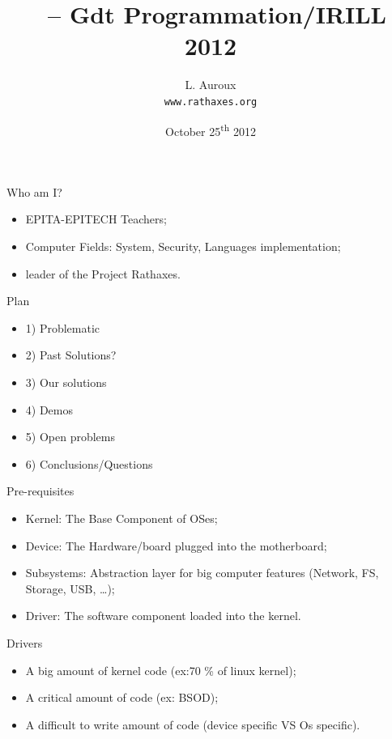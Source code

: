\documentclass[xcolor={usenames,svgnames}]{beamer}
\title{\rtx\ -- Gdt Programmation/IRILL 2012}
\date{October 25\textsuperscript{th} 2012}
\author{L. Auroux\\ \texttt{www.rathaxes.org}}
\begin{document}
\begin{frame}
\titlepage
\end{frame}

\begin{frame}{Who am I?}
\begin{itemize}
\item EPITA-EPITECH Teachers;
\item Computer Fields: System, Security, Languages implementation;
\item leader of the Project Rathaxes.
\end{itemize}
\end{frame}

\begin{frame}{Plan}
\begin{itemize}
\item 1) Problematic
\item 2) Past Solutions?
\item 3) Our solutions
\item 4) Demos
\item 5) Open problems
\item 6) Conclusions/Questions
\end{itemize}
\end{frame}

\begin{frame}{Pre-requisites}
\begin{itemize}
\item Kernel: The Base Component of OSes;
\item Device: The Hardware/board plugged into the motherboard;
\item Subsystems: Abstraction layer for big computer features (Network, FS, Storage, USB, \ldots);
\item Driver: The software component loaded into the kernel.
\end{itemize}
\end{frame}

\begin{frame}{Drivers}
\begin{itemize}
\item A big amount of kernel code (ex:70 \% of linux kernel);
\item A critical amount of code (ex: BSOD);
\item A difficult to write amount of code (device specific VS Os specific).
\end{itemize}
\end{frame}
\end{document}
